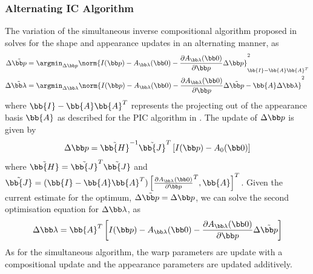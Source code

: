\subsubsection{Alternating IC Algorithm}\label{subsec:aam-alternating}
The variation of the simultaneous inverse compositional algorithm proposed in
\cite{matthews2004active} solves for the shape and appearance updates in an
alternating manner, as
\begin{equation}
    \begin{aligned}\label{eq:aam-alternating}
        \Delta \tilde{\p} &=       \argmin_{\Delta \p}       \norm{I(\p) - A_{\blambda}(\zero) - \frac{\partial A_{\blambda}(\zero)}{\partial \p} \Delta \p}^2_{\bb{I} - \bb{A} \bb{A}^T} \\
        \Delta \tilde{\blambda} &= \argmin_{\Delta \blambda} \norm{I(\p) - A_{\blambda}(\zero) - \frac{\partial A_{\blambda}(\zero)}{\partial \p} \Delta \tilde{\p} - \bb{A} \Delta \blambda}^2
    \end{aligned}
\end{equation}
where $\bb{I} - \bb{A} \bb{A}^T$ represents the
projecting out of the appearance basis $\bb{A}$ as described for the PIC
algorithm in \cite{matthews2004active}. The update of $\Delta \p$ is given by
\begin{equation}\label{eq:aam-alternating-deltap-update}
        \Delta \p = {\tilde{\bb{H}}}^{-1} {\tilde{\bb{J}}}^{T} \left[ I(\p) - A_0(\zero) \right]
\end{equation}
where ${\tilde{\bb{H}}} = {\tilde{\bb{J}}}^{T}
\tilde{\bb{J}}$ and $\tilde{\bb{J}} = (\bb{I} -
\bb{A} \bb{A}^T) \left[ {\frac{\partial
A_{\blambda}(\zero)}{\partial \p}}^T, \bb{A} \right]^T$. Given the
current estimate for the optimum, $\Delta \tilde{\p} = \Delta \p$, we can solve
the second optimisation equation for $\Delta \blambda$, as
\begin{equation}\label{eq:aam-alternating-deltalambda-update}
        \Delta \blambda = \bb{A}^T \left[ I(\p) - A_{\blambda}(\zero) - \frac{\partial A_{\blambda}(\zero)}{\partial \p} \Delta \tilde{\p} \right]
\end{equation}
As for the simultaneous algorithm, the warp parameters are update with a
compositional update and the appearance parameters are updated additively.
